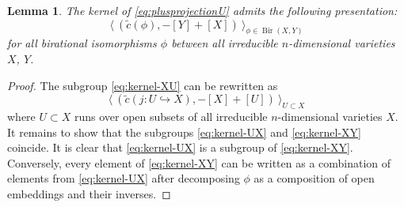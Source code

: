 \documentclass[a4paper,12pt]{amsart}
\def\Bir{{\operatorname{Bir}}}
\theoremstyle{plain}
\newtheorem{lemma}[dummy]{Lemma}
\numberwithin{equation}{section}
\theoremstyle{definition}
\newcommand{\ti}[1]{\tilde{#1}}
\renewcommand{\(}{\left(}
\renewcommand{\)}{\right)}
\newcommand{\hto}{\hookrightarrow}
\begin{document}
\begin{lemma}\label{lem:kernelXY}
The kernel of \eqref{eq:plusprojectionU}
admits the following presentation:
\begin{equation}\label{eq:kernel-XY}
\langle \ \left( \ti{c}(\phi), 
-[Y] + [X] \right) \ \rangle_{\phi \in \Bir(X,Y)}
\end{equation}
for all birational isomorphisms $\phi$
between all irreducible $n$-dimensional
varieties $X$, $Y$.
\end{lemma}
\begin{proof}
The subgroup \eqref{eq:kernel-XU} can be rewritten as
\begin{equation}\label{eq:kernel-UX}
\langle \ \left( \ti{c}(j:U \hto X), 
- [X] + [U] \right) \ \rangle_{U \subset X}
\end{equation}
where 
$U \subset X$ runs over 
open subsets of all irreducible $n$-dimensional
varieties $X$. 
It remains to show that the subgroups \eqref{eq:kernel-UX}
and \eqref{eq:kernel-XY} coincide.
It is clear that \eqref{eq:kernel-UX} is a subgroup of
\eqref{eq:kernel-XY}. Conversely, every element of
\eqref{eq:kernel-XY} can be written as a combination
of elements
from \eqref{eq:kernel-UX} after decomposing
$\phi$ as a composition of open embeddings and their inverses.
\end{proof}
\end{document}
